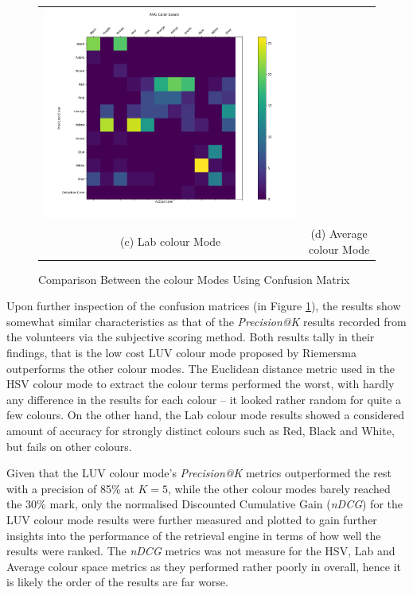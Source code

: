 \begin{figure}[tb!]
\begin{tabular}{cc}
    \includegraphics[width=0.4\linewidth]{image/retrievalTwo/avgCM.png} \\
    (c) Lab colour Mode & (d) Average colour Mode \\
  \end{tabular}
  \caption{Comparison Between the colour Modes Using Confusion Matrix}
  \label{fig:colorspace_Confuscore}
\end{figure}

Upon further inspection of the confusion matrices (in Figure \ref{fig:colorspace_Confuscore}), the results show somewhat similar characteristics as that of the \textit{Precision@K} results recorded from the volunteers via the subjective scoring method. Both results tally in their findings, that is the low cost LUV colour mode proposed by Riemersma\cite{riemersma} outperforms the other colour modes. The Euclidean distance metric used in the HSV colour mode to extract the colour terms performed the worst, with hardly any difference in the results for each colour -- it looked rather random for quite a few colours. On the other hand, the Lab colour mode results showed a considered amount of accuracy for strongly distinct colours such as Red, Black and White, but fails on other colours.

Given that the LUV colour mode's \textit{Precision@K} metrics outperformed the rest with a precision of 85\% at $K=5$, while the other colour modes barely reached the 30\% mark, only the normalised Discounted Cumulative Gain (\textit{nDCG}) for the LUV colour mode results were further measured and plotted to gain further insights into the performance of the retrieval engine in terms of how well the results were ranked. The \textit{nDCG} metrics was not measure for the HSV, Lab and Average colour space metrics as they performed rather poorly in overall, hence it is likely the order of the results are far worse. 

